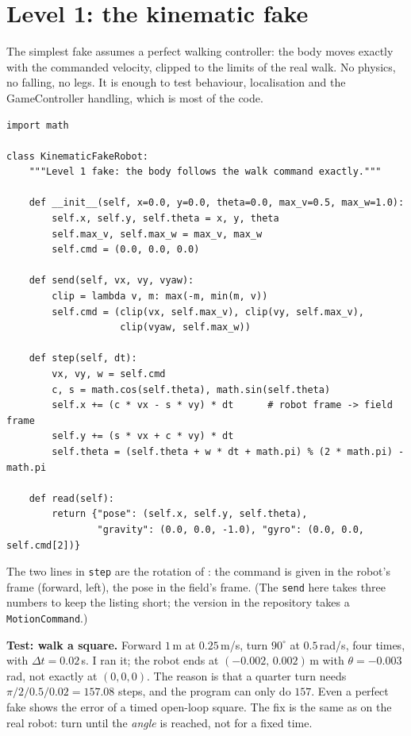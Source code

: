 \section*{Level 1: the kinematic fake}
The simplest fake assumes a perfect walking controller: the body moves exactly with the commanded velocity, clipped to the limits of the real walk. No physics, no falling, no legs. It is enough to test behaviour, localisation and the GameController handling, which is most of the code.
\begin{verbatim}
import math

class KinematicFakeRobot:
    """Level 1 fake: the body follows the walk command exactly."""

    def __init__(self, x=0.0, y=0.0, theta=0.0, max_v=0.5, max_w=1.0):
        self.x, self.y, self.theta = x, y, theta
        self.max_v, self.max_w = max_v, max_w
        self.cmd = (0.0, 0.0, 0.0)

    def send(self, vx, vy, vyaw):
        clip = lambda v, m: max(-m, min(m, v))
        self.cmd = (clip(vx, self.max_v), clip(vy, self.max_v),
                    clip(vyaw, self.max_w))

    def step(self, dt):
        vx, vy, w = self.cmd
        c, s = math.cos(self.theta), math.sin(self.theta)
        self.x += (c * vx - s * vy) * dt      # robot frame -> field frame
        self.y += (s * vx + c * vy) * dt
        self.theta = (self.theta + w * dt + math.pi) % (2 * math.pi) - math.pi

    def read(self):
        return {"pose": (self.x, self.y, self.theta),
                "gravity": (0.0, 0.0, -1.0), "gyro": (0.0, 0.0, self.cmd[2])}
\end{verbatim}
The two lines in \texttt{step} are the rotation of : the command is given in the robot's frame (forward, left), the pose in the field's frame. (The \texttt{send} here takes three numbers to keep the listing short; the version in the repository takes a \texttt{MotionCommand}.)

\textbf{Test: walk a square.} Forward $1$\,m at $0.25$\,m/s, turn $90^\circ$ at $0.5$\,rad/s, four times, with $\Delta t=0.02$\,s. I ran it; the robot ends at $(-0.002,\,0.002)$\,m with $\theta=-0.003$\,rad, not exactly at $(0,0,0)$. The reason is that a quarter turn needs $\pi/2/0.5/0.02=157.08$ steps, and the program can only do $157$. Even a perfect fake shows the error of a timed open-loop square. The fix is the same as on the real robot: turn until the \emph{angle} is reached, not for a fixed time.

